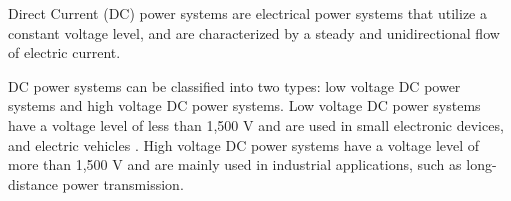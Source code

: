 Direct Current (DC) power systems are electrical power systems that utilize a constant voltage level, and are characterized by a steady and unidirectional flow of electric current. 

DC power systems can be classified into two types: low voltage DC power systems and high voltage DC power systems. Low voltage DC power systems have a voltage level of less than 1,500 V and are used in small electronic devices, and electric vehicles \cite{IEC60038}. High voltage DC power systems have a voltage level of more than 1,500 V and are mainly used in industrial applications, such as long-distance power transmission.


\begin{comment}

potential sources
[1] J. Grainger and W. Stevenson, Power System Analysis, McGraw-Hill, 1994.
[2] T.A. Short, Power System Stability and Control, IEEE Press, 1993.
[3] J.K. Saini and P. Kundur, Power System Stability and Control, CRC Press, 2007.
[4] R. Lasseter and G. Andhankar, "Microgrids and Active Distribution Networks," IEEE Power and Energy Magazine, vol. 11, no. 3, pp. 40-50, 2013.
\end{comment}